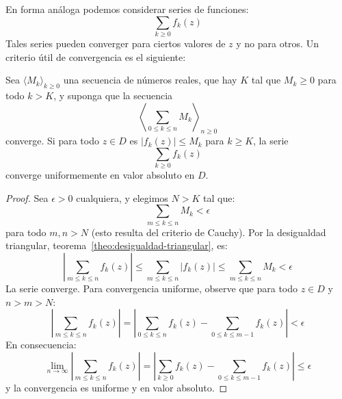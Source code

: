   En forma análoga podemos considerar series de funciones:
  \begin{equation*}
    \sum_{k \ge 0} f_k(z)
  \end{equation*}
  Tales series pueden converger para ciertos valores de \(z\)
  y no para otros.
  Un criterio útil de convergencia es el siguiente:
  \begin{theorem}
    \label{theo:Weierstrass-M}
    Sea \(\langle M_k \rangle_{k \ge 0}\)
    una secuencia de números reales,
    que hay \(K\) tal que \(M_k \ge 0\) para todo \(k > K\),
    y suponga que la secuencia
    \begin{equation*}
      \left\langle \sum_{0 \le k \le n} M_k \right\rangle_{n \ge 0}
    \end{equation*}
    converge.
    Si para todo \(z \in D\) es
    \(\lvert f_k(z) \rvert \le M_k\) para \(k \ge K\),
    la serie
    \begin{equation*}
      \sum_{k \ge 0} f_k(z)
    \end{equation*}
    converge uniformemente en valor absoluto en \(D\).
  \end{theorem}
  \begin{proof}
    Sea \(\epsilon > 0\) cualquiera,
    y elegimos \(N > K\) tal que:
    \begin{equation*}
      \sum_{m \le k \le n} M_k
	< \epsilon
    \end{equation*}
    para todo \(m, n > N\)
    (esto resulta del criterio de Cauchy).
    Por la desigualdad triangular,
    teorema~\ref{theo:desigualdad-triangular},
    es:
    \begin{equation*}
      \left\lvert
	\sum_{m \le k \le n} f_k(z)
      \right\rvert
	\le \sum_{m \le k \le n} \lvert f_k(z) \rvert
	\le \sum_{m \le k \le n} M_k
	< \epsilon
    \end{equation*}
    La serie converge.
    Para convergencia uniforme,
    observe que para todo \(z \in D\) y \(n > m > N\):
    \begin{equation*}
      \left\lvert
	\sum_{m \le k \le n} f_k(z)
      \right\rvert
	= \left\lvert
	    \sum_{0 \le k \le n} f_k(z)
	      - \sum_{0 \le k \le m - 1} f_k(z)
	  \right\rvert
	< \epsilon
    \end{equation*}
    En consecuencia:
    \begin{equation*}
      \lim_{n \rightarrow \infty}
	\left\lvert
	  \sum_{m \le k \le n} f_k(z)
	\right\rvert
	= \left\lvert
	    \sum_{k \ge 0} f_k(z)
	      - \sum_{0 \le k \le m - 1} f_k(z)
	  \right\rvert
	\le \epsilon
    \end{equation*}
    y la convergencia es uniforme y en valor absoluto.
  \end{proof}

